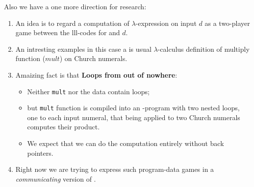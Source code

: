 \documentclass[a4paper, 10pt]{article} %
\newcommand{\bi}{\begin{itemize}}
\newcommand{\ei}{\end{itemize}}
\newcommand{\be}{\begin{enumerate}}
\newcommand{\ee}{\end{enumerate}}
\newcommand{\ii}{\item}
\newcommand{\red}[1]{{\color{red}#1}}
\newcommand{\green}[1]{{\color{blue!20!black!30!green}#1}}
\newcommand{\blue}[1]{{\color{blue}#1}}
\newcommand{\lam}[1]{{\color{brown}\emph{\boldmath{#1}}}}
\begin{document}
Also we have a one more direction for research:
\be
\ii An idea is to regard a \green{computation of $\lambda$-expression \lam{$M$} on input $d$} as a
  \red{ \blue{two-player game} between the {\sc lll}-codes for \lam{$M$} and $d$}.
\ii An intresting examples in this case a is usual $\lambda$-calculus definition of multiply function ($mult$)
  on Church numerals.
\ii Amaizing fact is that \textbf{Loops from out of nowhere}:
  \bi
  \ii \green{Neither {\tt mult} nor the data contain loops};
  \ii but  {\tt mult} function is compiled into \blue{an {\lam{LLL}}-program with two nested loops}, one to each input numeral,
    that being applied to two Church numerals computes their product.
  \ii We expect that we can do the computation \green{entirely without back pointers}.
  \ei
\ii Right now we are trying to express such program-data games in a \red{\em communicating}
  version of \lam{LLL}. 
\ee
\end{document}

